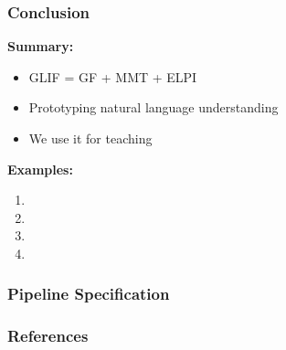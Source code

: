 \documentclass[aspectratio=169]{beamer}
\begin{document}



\begin{frame}
    \frametitle{Conclusion}
    \begin{minipage}[t]{0.5\textwidth}
        \textbf{Summary:}
        \begin{itemize}
            \item GLIF = GF + MMT + ELPI
            \item Prototyping natural language understanding %
            \item We use it for teaching
        \end{itemize}
    \end{minipage}
    \begin{minipage}[t]{0.49\textwidth}
        \textbf{Examples:}
        \begin{enumerate}
            \item {}
            \item {}
            \item {}
            \item {}
        \end{enumerate}
    \end{minipage}
    
    \vspace{1em}
    \centering
    
\end{frame}

\appendix


\begin{frame}
    \frametitle{Pipeline Specification}
    
\end{frame}








\begin{frame}[allowframebreaks,t]
    \frametitle{References}
    \printbibliography
\end{frame}
\end{document}
